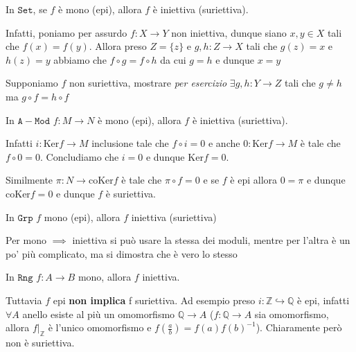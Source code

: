 \begin{example}{}
    In \(\mathtt{Set}\), se \(f\) è mono (epi), allora \(f\) è iniettiva
    (suriettiva).

    Infatti, poniamo per assurdo \(f : X \to Y\) non iniettiva, dunque siano \(x, y \in X\) tali che \(f{(x)} = f{(y)}\). Allora preso \(Z = \{z\} \) e \(g, h : Z\to X\) tali che \(g
    {(z)} = x\) e \(h{(z)} = y\) abbiamo che \(f \circ g = f \circ h\) da cui \(g = h\) e dunque \(x = y\) 

    Supponiamo \(f\) non suriettiva, mostrare \emph{per esercizio} \(\exists g, h : Y \to Z\) tali che
    \(g \neq h\) ma \(g \circ f = h \circ f\) 
\end{example}

\begin{example}{}
    In \(\mathtt{A-Mod}\) \(f : M \to N\) è mono (epi), allora \(f\) è iniettiva (suriettiva).

    Infatti \(i : \mathrm{Ker}f \to M\) inclusione tale che \(f \circ i = 0\) e
    anche \(0 : \mathrm{Ker}f \to M\) è tale che \(f \circ 0 = 0\). Concludiamo
    che \(i = 0\) e dunque \(\mathrm{Ker}f = 0\).

    Similmente \(\pi : N \to \mathrm{coKer}f\) è tale che \(\pi \circ f = 0\) e
    se \(f\) è epi allora \(0 = \pi \) e dunque \(\mathrm{coKer} f= 0\) e dunque
    \(f\) è suriettiva.
\end{example}

\begin{example}{}
    In \(\mathtt{Grp}\) \(f\) mono (epi), allora \(f\) iniettiva (suriettiva)

    Per mono \(\implies \) iniettiva si può usare la stessa dei moduli, mentre
    per l'altra è un po' più complicato, ma si dimostra che è vero lo stesso
\end{example}

\begin{example}{}
    In \(\mathtt{Rng}\) \(f : A\to B\) mono, allora \(f\) iniettiva. %

    Tuttavia \(f\) epi \textbf{non implica} f suriettiva. Ad esempio preso \(i :
    \mathbb{Z} \hookrightarrow \mathbb{Q}\) è epi, infatti \(\forall A\) anello
    esiste al più un omomorfismo \(\mathbb{Q} \to A\) (\(f : \mathbb{Q}\to A\)
    sia omomorfismo, allora \(f|_{\mathbb{Z}} \) è l'unico omomorfismo e \(f{(\frac{a}{b})} = f{(a)}f{(b)}^{-1}\)). Chiaramente però non è suriettiva.
\end{example}

